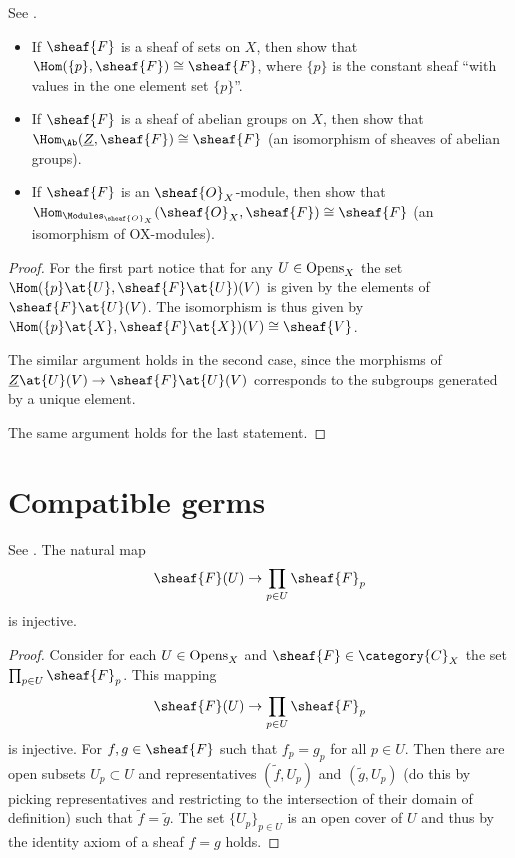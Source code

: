 \begin{exercise}[2.3.D]
  See \cite[2.3.D]{vakil2024the-rising-sea}.
  \begin{itemize}
  \item If $\sheaf{F}$ is a sheaf of sets on $X$, then show that
    $\Hom(\{p\}, \sheaf{F} ) \cong \sheaf{F}$, where $\{p\}$ is the
    constant sheaf “with values in the one element set $\{p\}$”.
  \item If $\sheaf{F}$ is a sheaf of abelian groups on $X$, then
    show that $\Hom_{\Ab} (\underline{Z}, \sheaf{F} )\cong
    \sheaf{F}$ (an isomorphism of sheaves of abelian groups).
  \item If $\sheaf{F}$ is an $\sheaf{O}_X$-module, then show that
    $\Hom_{\Modules_{\sheaf{O}_X}} (\sheaf{O}_X,\sheaf{F} ) \cong
    \sheaf{F}$ (an isomorphism of OX-modules).
  \end{itemize}
\end{exercise}

\begin{proof}
  For the first part notice that for any $U\in \mathrm{Opens}_X$ the set
  $\Hom(\{p\}\at{U},\sheaf{F}\at{U})(V)$ is given by the elements of
  $\sheaf{F}\at{U}(V)$. The isomorphism is thus given by
  $\Hom(\{p\}\at{X},\sheaf{F}\at{X})(V)\cong \sheaf{V}$.

  The similar argument holds in the second case, since the morphisms of
  $\underline{Z}\at{U}(V)\rightarrow \sheaf{F}\at{U}(V)$ corresponds
  to the subgroups generated by a unique element.

  The same argument holds for the last statement.
\end{proof}

\section{Compatible germs}

\begin{exercise}[2.4.A]
  See \cite[2.4.A]{vakil2024the-rising-sea}.
  The natural map
  \begin{align*}
    \sheaf{F}(U)\rightarrow \prod_{p\in U} \sheaf{F}_p
  \end{align*}
  is injective.
\end{exercise}

\begin{proof}
  Consider for each $U\in \mathrm{Opens}_X$ and $\sheaf{F}\in \category{C}_X$
  the set $\prod_{p\in U} \sheaf{F}_p$. This mapping
  \begin{align*}
    \sheaf{F}(U)\rightarrow \prod_{p\in U} \sheaf{F}_p
  \end{align*}
  is injective. For $f,g\in \sheaf{F}$ such that $f_p = g_p$ for all
  $p\in U$. Then there are open subsets $U_p\subset U$ and
  representatives $(\tilde{f},U_p)$ and $(\tilde{g},U_p)$ (do this by
  picking representatives and restricting to the intersection of their
  domain of definition) such that $\tilde{f}=\tilde{g}$. The set
  $\{U_p\}_{p\in U}$ is an open cover of $U$ and thus by the identity
  axiom of a sheaf $f=g$ holds.
\end{proof}

